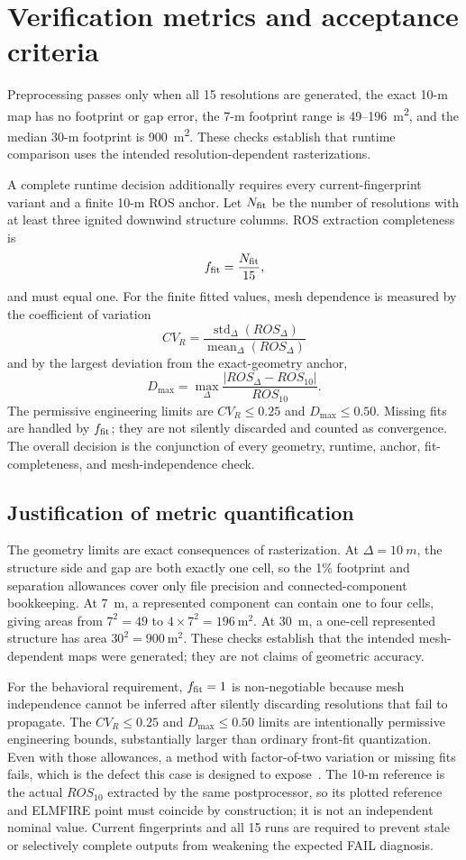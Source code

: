\section{Verification metrics and acceptance criteria}

Preprocessing passes only when all 15 resolutions are generated, the exact
10-m map has no footprint or gap error, the 7-m footprint range is
49--\SI{196}{m^2}, and the median 30-m footprint is \SI{900}{m^2}.
These checks establish that runtime comparison uses the intended
resolution-dependent rasterizations.

A complete runtime decision additionally requires every current-fingerprint
variant and a finite 10-m ROS anchor. Let \(N_{\rm fit}\) be the number of
resolutions with at least three ignited downwind structure columns. ROS
extraction completeness is
\[
 f_{\rm fit}=\frac{N_{\rm fit}}{15},
\]
and must equal one. For the finite fitted values, mesh dependence is measured
by the coefficient of variation
\[
 CV_R=\frac{\operatorname{std}_{\Delta}(ROS_\Delta)}
            {\operatorname{mean}_{\Delta}(ROS_\Delta)}
\]
and by the largest deviation from the exact-geometry anchor,
\[
 D_{\max}=\max_\Delta\frac{|ROS_\Delta-ROS_{10}|}{ROS_{10}}.
\]
The permissive engineering limits are \(CV_R\le0.25\) and
\(D_{\max}\le0.50\). Missing fits are handled by \(f_{\rm fit}\); they are not
silently discarded and counted as convergence. The overall decision is the
conjunction of every geometry, runtime, anchor, fit-completeness, and
mesh-independence check.


\subsection{Justification of metric quantification}

The geometry limits are exact consequences of rasterization.  At
\(\Delta=\SI{10}{m}\), the structure side and gap are both exactly one cell,
so the 1\% footprint and separation allowances cover only file precision and
connected-component bookkeeping.  At \SI{7}{m}, a represented component can
contain one to four cells, giving areas from \(7^2=49\) to
\(4\times7^2=196\ \mathrm{m^2}\).  At \SI{30}{m}, a one-cell represented
structure has area \(30^2=900\ \mathrm{m^2}\).  These checks establish that
the intended mesh-dependent maps were generated; they are not claims of
geometric accuracy.

For the behavioral requirement, \(f_{\rm fit}=1\) is non-negotiable because
mesh independence cannot be inferred after silently discarding resolutions
that fail to propagate.  The \(CV_R\le0.25\) and \(D_{\max}\le0.50\)
limits are intentionally permissive engineering bounds, substantially larger
than ordinary front-fit quantization.  Even with those allowances, a method
with factor-of-two variation or missing fits fails, which is the defect this
case is designed to expose~\cite{QinEtAl2026}.  The 10-m reference is the
actual \(ROS_{10}\) extracted by the same postprocessor, so its plotted
reference and ELMFIRE point must coincide by construction; it is not an
independent nominal value.  Current fingerprints and all 15 runs are required
to prevent stale or selectively complete outputs from weakening the expected
FAIL diagnosis.

